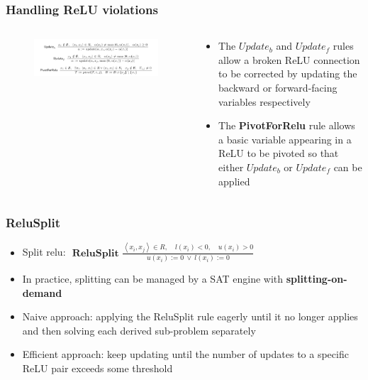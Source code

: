 \documentclass[aspectratio=169%
,serif,mathserif]{beamer}
\begin{document}
\begin{frame}
	\frametitle{Handling ReLU violations}
	\begin{columns}
		\begin{column}{.65\textwidth}
			\begin{figure}[htbp]
				\includegraphics[width=1\linewidth]{6.png}
			\end{figure}
		\end{column}

		\begin{column}{.35\textwidth}
			\begin{itemize}
				\item  The \textbf{$Update_b$} and \textbf{$Update_f$} rules allow a broken ReLU connection to be
				corrected by updating the backward or forward-facing variables respectively
				\item  The \textbf{PivotForRelu} rule allows a basic variable appearing in a ReLU to be pivoted so that either \textbf{$Update_b$} or \textbf{$Update_f$} can be applied
			\end{itemize}
		\end{column}
	\end{columns}
\end{frame}

\begin{frame}
	\frametitle{ReluSplit}
	\begin{itemize}
		\item Split relu: $\textbf { ReluSplit } \frac{\left\langle x_{i}, x_{j}\right\rangle \in R, \quad l(x_{i})<0, \quad u(x_{i})>0}{u(x_{i}):=0~\vee~l(x_{i}):=0}$
		\item In practice, splitting can be managed by a SAT engine with \textbf{splitting-on-demand}
		\item Naive approach: applying the ReluSplit rule eagerly until it no longer applies and then solving each derived sub-problem separately
		\item Efficient approach: keep updating until the number of updates to a specific ReLU pair exceeds some threshold
	\end{itemize}

\end{frame}
\end{document}
